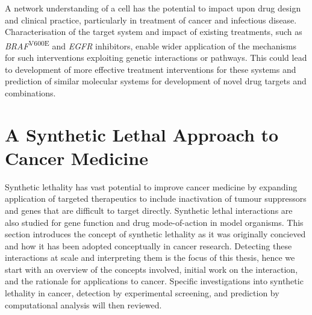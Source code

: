 A network understanding of a cell has the potential to impact upon drug design and clinical practice, particularly in treatment of cancer and infectious disease. Characterisation of the target system and impact of existing treatments, such as  \textit{BRAF}\textsuperscript{V600E} and \textit{EGFR} inhibitors, enable wider application of the mechanisms for such interventions exploiting genetic interactions or pathways. This could lead to development of more effective treatment interventions for these systems and prediction of similar molecular systems for development of novel drug targets and combinations.  



\section{A Synthetic Lethal Approach to Cancer Medicine}

Synthetic lethality has vast potential to improve cancer medicine by expanding application of targeted therapeutics to include inactivation of tumour suppressors and genes that are difficult to target directly. Synthetic lethal interactions are also studied for gene function and drug mode-of-action in model organisms. This section introduces the concept of synthetic lethality as it was originally concieved and how it has been adopted conceptually in cancer research. Detecting these interactions at scale and interpreting them is the focus of this thesis, hence we start with an overview of the concepts involved, initial work on the interaction, and the rationale for applications to cancer. Specific investigations into synthetic lethality in cancer, detection by experimental screening, and prediction by computational analysis will then reviewed.



